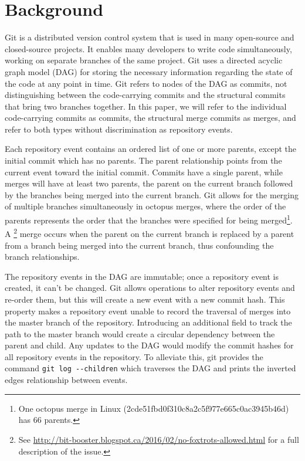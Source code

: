 
\section{Background}

Git is a distributed version control system that is used in many
open-source and closed-source projects. It enables many developers to
write code simultaneously, working on separate branches of the same
project. Git uses a directed acyclic graph model (DAG) for storing the
necessary information regarding the state of the code at any point in
time. Git refers to nodes of the DAG as commits, not distinguishing
between the code-carrying commits and the structural commits that bring
two branches together. In this paper, we will refer to the individual
code-carrying commits as commits, the structural merge commits as
merges, and refer to both types without discrimination as repository
events.

Each repository event contains an ordered list of one or more parents,
except the initial commit which has no parents. The parent relationship
points from the current event toward the initial commit.  Commits have a
single parent, while merges will have at least two parents, the parent
on the current branch followed by the branches being merged into the
current branch. Git allows for the merging of multiple branches
simultaneously in octopus merges, where the order of the parents
represents the order that the branches were specified for being merged\footnote{One octopus merge in Linux
  (2cde51fbd0f310c8a2c5f977e665c0ac3945b46d) has 66 parents.}.
A \foxtrot\footnote{See
  \url{http://bit-booster.blogspot.ca/2016/02/no-foxtrots-allowed.html}
  for a full description of the issue.} merge occurs when the parent on
the current branch is replaced by a parent from a branch being merged
into the current branch, thus confounding the branch relationships.


The repository events in the DAG are immutable; once a repository event
is created, it can't be changed. Git allows operations to alter
repository events and re-order them, but this will create a new event
with a new commit hash. This property makes a repository event unable to
record the traversal of merges into the master branch of the repository.
Introducing an additional field to track the path to the master branch
would create a circular dependency between the parent and child. Any
updates to the DAG would modify the commit hashes for all repository
events in the repository. To alleviate this, git provides the command
\verb|git log --children| which traverses the DAG and prints the
inverted edges relationship between events.

